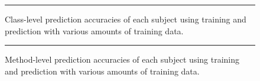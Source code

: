 \begin{figure}[ht!]
  \centering
  \begin{adjustbox}{max size={.95\textwidth}{.95\textheight}}
    
  \end{adjustbox}
  \caption{Class-level prediction accuracies of each subject using training and prediction with various amounts of training data.}
  \vspace{2mm}
  \hrule
  \label{fig:divisor_class_graph}
\end{figure}

\begin{figure}[ht!]
  \centering
  \begin{adjustbox}{max size={.95\textwidth}{.95\textheight}}
    
  \end{adjustbox}
  \caption{Method-level prediction accuracies of each subject using training and prediction with various amounts of training data.}
  \vspace{2mm}
  \hrule
  \label{fig:divisor_method_graph}
\end{figure}

